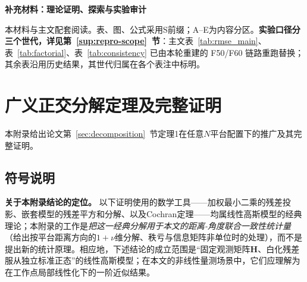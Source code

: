 \documentclass[UTF8,a4paper,zihao=-4]{ctexart}
\begin{document}
\begin{center}{\LARGE\bfseries 补充材料：理论证明、探索与实验审计\par}\end{center}
\renewcommand{\thesection}{\Alph{section}}
\renewcommand{\theequation}{S\arabic{equation}}
\renewcommand{\thetable}{S\arabic{table}}
\renewcommand{\thefigure}{S\arabic{figure}}
本材料与主文配套阅读。表、图、公式采用S前缀；A--E为内容分区。\textbf{实验口径分三个世代，详见第~\ref{sup:repro-scope}~节}：主文表~\ref{tab:rmse_main}、表~\ref{tab:factorial}、表~\ref{tab:consistency} 已由本轮重建的 F50/F60 链路重跑替换；其余表沿用历史结果，其世代归属在各个表注中标明。

\section{广义正交分解定理及完整证明}\label{sup:proof}

本附录给出论文第~\ref{sec:decomposition}~节定理1在任意\(N\)平台配置下的推广及其完整证明。

\subsection{符号说明}

\noindent\textbf{关于本附录结论的定位。} 以下证明使用的数学工具——加权最小二乘的残差投影、嵌套模型的残差平方和分解、以及Cochran定理——均属线性高斯模型的经典理论；本附录的工作是\emph{把这一经典分解用于本文的距离-角度联合一致性统计量}（给出按平台距离方向的\(1+\nu\)维分解、秩亏与信息矩阵非单位时的处理），而不是提出新的统计原理。相应地，下述结论的成立范围是“固定观测矩阵\(\boldsymbol H\)、白化残差服从独立标准正态”的线性高斯模型；在本文的非线性量测场景中，它们应理解为在工作点局部线性化下的一阶近似结果。
\end{document}
